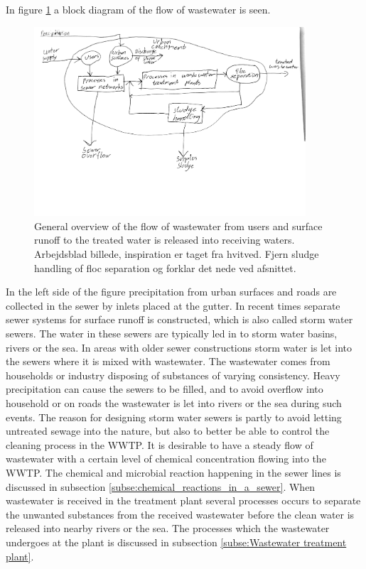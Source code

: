 In figure \ref{fig:sewer_overview_of_the_different_parts} a block diagram of the flow of wastewater is seen.
\begin{figure}[H]
\centering
\includegraphics[width=0.9\textwidth]{report/introduction/pictures/sewer_process2.pdf}
\caption{General overview of the flow of wastewater from users and surface runoff to the treated water is released into receiving waters. Arbejdsblad billede, inspiration er taget fra hvitved. Fjern sludge handling of floc separation og forklar det nede ved afsnittet.}
\label{fig:sewer_overview_of_the_different_parts}
\end{figure}

In the left side of the figure precipitation from urban surfaces and roads are collected in the sewer by inlets placed at the gutter. In recent times separate sewer systems for surface runoff is constructed, which is also called storm water sewers. The water in these sewers are typically led in to storm water basins, rivers or the sea. In areas with older sewer constructions storm water is let into the sewers where it is mixed with wastewater. The wastewater comes from households or industry disposing of substances of varying consistency. Heavy precipitation can cause the sewers to be filled, and to avoid overflow into household or on roads the wastewater is let into rivers or the sea during such events. 
The reason for designing storm water sewers is partly to avoid letting untreated sewage into the nature, but also to better be able to control the cleaning process in the WWTP. It is desirable to have a steady flow of wastewater with a certain level of chemical concentration flowing into the WWTP. The chemical and microbial reaction happening in the sewer lines is discussed in subsection \ref{subse:chemical_reactions_in_a_sewer}. When wastewater is received in the treatment plant several processes occurs to separate the unwanted substances from the received wastewater before the clean water is released into nearby rivers or the sea. The processes which the wastewater undergoes at the plant is discussed in subsection \ref{subse:Wastewater treatment plant}.  


